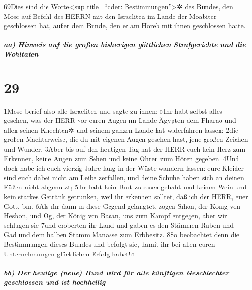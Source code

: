 69Dies sind die Worte\textless sup title=``oder:
Bestimmungen''\textgreater✲ des Bundes, den Mose auf Befehl des HERRN
mit den Israeliten im Lande der Moabiter geschlossen hat, außer dem
Bunde, den er am Horeb mit ihnen geschlossen hatte.

\hypertarget{aa-hinweis-auf-die-grouxdfen-bisherigen-guxf6ttlichen-strafgerichte-und-die-wohltaten}{%
\subparagraph{aa) Hinweis auf die großen bisherigen göttlichen
Strafgerichte und die
Wohltaten}\label{aa-hinweis-auf-die-grouxdfen-bisherigen-guxf6ttlichen-strafgerichte-und-die-wohltaten}}

\hypertarget{section-28}{%
\section{29}\label{section-28}}

1Mose berief also alle Israeliten und sagte zu ihnen: »Ihr habt selbst
alles gesehen, was der HERR vor euren Augen im Lande Ägypten dem Pharao
und allen seinen Knechten✲ und seinem ganzen Lande hat widerfahren
lassen: 2die großen Machterweise, die du mit eigenen Augen gesehen hast,
jene großen Zeichen und Wunder. 3Aber bis auf den heutigen Tag hat der
HERR euch kein Herz zum Erkennen, keine Augen zum Sehen und keine Ohren
zum Hören gegeben. 4Und doch habe ich euch vierzig Jahre lang in der
Wüste wandern lassen: eure Kleider sind euch dabei nicht am Leibe
zerfallen, und deine Schuhe haben sich an deinen Füßen nicht abgenutzt;
5ihr habt kein Brot zu essen gehabt und keinen Wein und kein starkes
Getränk getrunken, weil ihr erkennen solltet, daß ich der HERR, euer
Gott, bin. 6Als ihr dann in diese Gegend gelangtet, zogen Sihon, der
König von Hesbon, und Og, der König von Basan, uns zum Kampf entgegen,
aber wir schlugen sie 7und eroberten ihr Land und gaben es den Stämmen
Ruben und Gad und dem halben Stamm Manasse zum Erbbesitz. 8So beobachtet
denn die Bestimmungen dieses Bundes und befolgt sie, damit ihr bei allen
euren Unternehmungen glücklichen Erfolg habet!«

\hypertarget{bb-der-heutige-neue-bund-wird-fuxfcr-alle-kuxfcnftigen-geschlechter-geschlossen-und-ist-hochheilig}{%
\subparagraph{bb) Der heutige (neue) Bund wird für alle künftigen
Geschlechter geschlossen und ist
hochheilig}\label{bb-der-heutige-neue-bund-wird-fuxfcr-alle-kuxfcnftigen-geschlechter-geschlossen-und-ist-hochheilig}}


